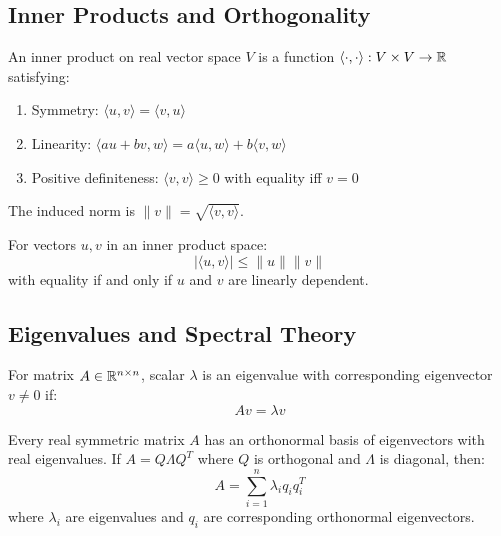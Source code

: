 \subsection{Inner Products and Orthogonality}

\begin{definition}
An inner product on real vector space $V$ is a function $\langle \cdot, \cdot \rangle: V \times V \to \mathbb{R}$ satisfying:
\begin{enumerate}
    \item Symmetry: $\langle u, v \rangle = \langle v, u \rangle$
    \item Linearity: $\langle au + bv, w \rangle = a\langle u, w \rangle + b\langle v, w \rangle$
    \item Positive definiteness: $\langle v, v \rangle \geq 0$ with equality iff $v = 0$
\end{enumerate}
\end{definition}

The induced norm is $\|v\| = \sqrt{\langle v, v \rangle}$.

\begin{theorem}
For vectors $u, v$ in an inner product space:
\begin{equation}
|\langle u, v \rangle| \leq \|u\| \|v\|
\end{equation}
with equality if and only if $u$ and $v$ are linearly dependent.
\end{theorem}

\subsection{Eigenvalues and Spectral Theory}

\begin{definition}
For matrix $A \in \mathbb{R}^{n \times n}$, scalar $\lambda$ is an eigenvalue with corresponding eigenvector $v \neq 0$ if:
\begin{equation}
Av = \lambda v
\end{equation}
\end{definition}

\begin{theorem}
Every real symmetric matrix $A$ has an orthonormal basis of eigenvectors with real eigenvalues. If $A = Q\Lambda Q^T$ where $Q$ is orthogonal and $\Lambda$ is diagonal, then:
\begin{equation}
A = \sum_{i=1}^n \lambda_i q_i q_i^T
\end{equation}
where $\lambda_i$ are eigenvalues and $q_i$ are corresponding orthonormal eigenvectors.
\end{theorem}

